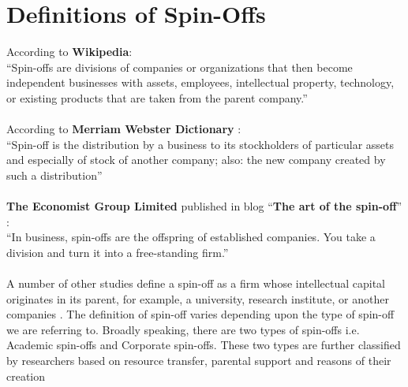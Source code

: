 \newpage

\section{Definitions of Spin-Offs\label{sec:defs_spinoffs}}

According to \textbf{Wikipedia}\cite{7}:
\\
``Spin-offs are divisions of companies or organizations that then become independent businesses
with assets, employees, intellectual property, technology, or existing products that are taken from
the parent company.''
\\
\\
According to \textbf{Merriam Webster Dictionary} \cite{11}:
\\
``Spin-off is the distribution by a business to its stockholders of particular assets and especially of
stock of another company; also: the new company created by such a distribution''
\\
\\
\textbf{The Economist Group Limited} published in blog ``\textbf{The art of the spin-off}'' \cite{12}:
\\
``In business, spin-offs are the offspring of established companies. You take a division and turn it
into a free-standing firm.''
\\
\\
A number of other studies define a spin-off as a firm whose intellectual capital originates in its
parent, for example, a university, research institute, or another companies \cite{13}.
The definition of spin-off varies depending upon the type of spin-off we are referring to. Broadly
speaking, there are two types of spin-offs i.e. Academic spin-offs and Corporate spin-offs. These
two types are further classified by researchers based on resource transfer, parental support and
reasons of their creation \cite{14}
